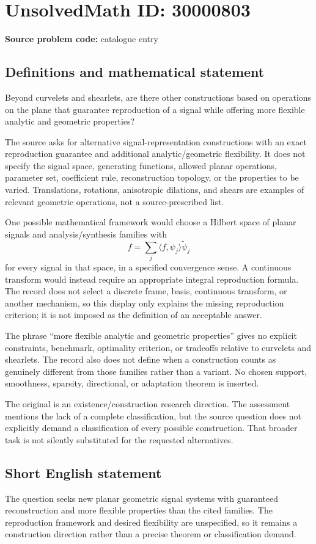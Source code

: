 \documentclass[11pt]{article}
\begin{document}
\section*{UnsolvedMath ID: 30000803}
\textbf{Source problem code:} catalogue entry
\subsection{Definitions and mathematical statement}
Beyond curvelets and shearlets, are there other constructions based on operations on the plane that guarantee reproduction of a signal while offering more flexible analytic and geometric properties?

The source asks for alternative signal-representation constructions with an exact reproduction guarantee and additional analytic/geometric flexibility. It does not specify the signal space, generating functions, allowed planar operations, parameter set, coefficient rule, reconstruction topology, or the properties to be varied. Translations, rotations, anisotropic dilations, and shears are examples of relevant geometric operations, not a source-prescribed list.

One possible mathematical framework would choose a Hilbert space of planar signals and analysis/synthesis families with
\[
 f=\sum_j\langle f,\psi_j\rangle\widetilde\psi_j
\]
for every signal in that space, in a specified convergence sense. A continuous transform would instead require an appropriate integral reproduction formula. The record does not select a discrete frame, basis, continuous transform, or another mechanism, so this display only explains the missing reproduction criterion; it is not imposed as the definition of an acceptable answer.

The phrase ``more flexible analytic and geometric properties'' gives no explicit constraints, benchmark, optimality criterion, or tradeoffs relative to curvelets and shearlets. The record also does not define when a construction counts as genuinely different from those families rather than a variant. No chosen support, smoothness, sparsity, directional, or adaptation theorem is inserted.

The original is an existence/construction research direction. The assessment mentions the lack of a complete classification, but the source question does not explicitly demand a classification of every possible construction. That broader task is not silently substituted for the requested alternatives.
\subsection{Short English statement}
The question seeks new planar geometric signal systems with guaranteed reconstruction and more flexible properties than the cited families. The reproduction framework and desired flexibility are unspecified, so it remains a construction direction rather than a precise theorem or classification demand.
\end{document}
